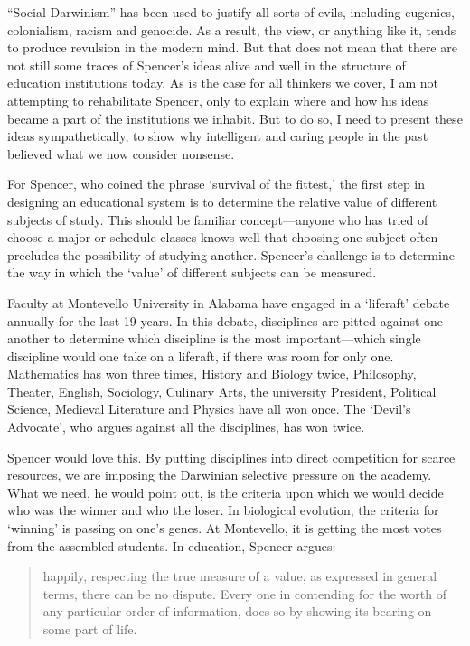 ``Social Darwinism'' has been used to justify all sorts of evils, including eugenics, colonialism, racism and genocide. As a result, the view, or anything like it, tends to produce revulsion in the modern mind. But that does not mean that there are not still some traces of Spencer's ideas alive and well in the structure of education institutions today. As is the case for all thinkers we cover, I am not attempting to rehabilitate Spencer, only to explain where and how his ideas became a part of the institutions we inhabit. But to do so, I need to present these ideas sympathetically, to show why intelligent and caring people in the past believed what we now consider nonsense.

For Spencer, who coined the phrase `survival of the fittest,' the first step in designing an educational system is to determine the relative value of different subjects of study. This should be familiar concept---anyone who has tried of choose a major or schedule classes knows well that choosing one subject often precludes the possibility of studying another. Spencer's challenge is to determine the way in which the `value' of different subjects can be measured.

Faculty at Montevello University in Alabama have engaged in a `liferaft' debate annually for the last 19 years. In this debate, disciplines are pitted against one another to determine which discipline is the most important---which single discipline would one take on a liferaft, if there was room for only one. Mathematics has won three times, History and Biology twice, Philosophy, Theater, English, Sociology, Culinary Arts, the university President, Political Science, Medieval Literature and Physics have all won once. The `Devil's Advocate', who argues against all the disciplines, has won twice. 

Spencer would love this. By putting disciplines into direct competition for scarce resources, we are imposing the Darwinian selective pressure on the academy. What we need, he would point out, is the criteria upon which we would decide who was the winner and who the loser. In biological evolution, the criteria for `winning' is passing on one's genes. At Montevello, it is getting the most votes from the assembled students. In education, Spencer argues: 

\begin{quote}

happily, respecting the true measure of a value, as expressed in general terms, there can be no dispute. Every one in contending for the worth of any particular order of information, does so by showing its bearing on some part of life. ~\citep[p. 15]{Spencer:1861ts}
\end{quote}

